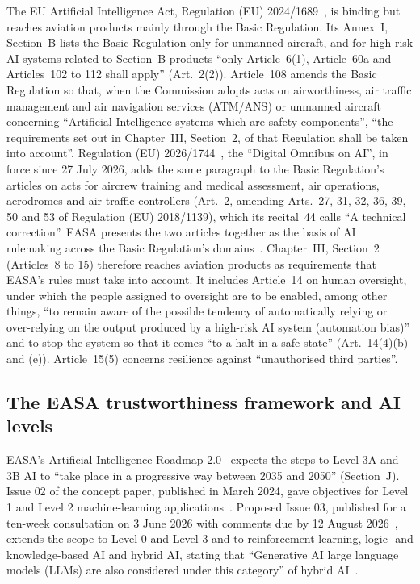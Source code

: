 \documentclass[11pt]{article}
\begin{document}
The EU Artificial Intelligence Act, Regulation (EU) 2024/1689~\cite{euaiact2024}, is binding but reaches aviation products mainly through the Basic Regulation. Its Annex~I, Section~B lists the Basic Regulation only for unmanned aircraft, and for high-risk AI systems related to Section~B products ``only Article~6(1), Article~60a and Articles~102 to 112 shall apply'' (Art.~2(2)). Article~108 amends the Basic Regulation so that, when the Commission adopts acts on airworthiness, air traffic management and air navigation services (ATM/ANS) or unmanned aircraft concerning ``Artificial Intelligence systems which are safety components'', ``the requirements set out in Chapter~III, Section~2, of that Regulation shall be taken into account''. Regulation (EU) 2026/1744~\cite{eu2026omnibus}, the ``Digital Omnibus on AI'', in force since 27 July 2026, adds the same paragraph to the Basic Regulation's articles on acts for aircrew training and medical assessment, air operations, aerodromes and air traffic controllers (Art.~2, amending Arts.~27, 31, 32, 36, 39, 50 and 53 of Regulation (EU) 2018/1139), which its recital~44 calls ``A technical correction''. EASA presents the two articles together as the basis of AI rulemaking across the Basic Regulation's domains~\cite[slide~21]{easa2026aidays}. Chapter~III, Section~2 (Articles~8 to 15) therefore reaches aviation products as requirements that EASA's rules must take into account. It includes Article~14 on human oversight, under which the people assigned to oversight are to be enabled, among other things, ``to remain aware of the possible tendency of automatically relying or over-relying on the output produced by a high-risk AI system (automation bias)'' and to stop the system so that it comes ``to a halt in a safe state'' (Art.~14(4)(b) and (e)). Article~15(5) concerns resilience against ``unauthorised third parties''.

\subsection{The EASA trustworthiness framework and AI levels}\label{sec:levels}

EASA's Artificial Intelligence Roadmap 2.0~\cite{easa2023roadmap} expects the steps to Level 3A and 3B AI to ``take place in a progressive way between 2035 and 2050'' (Section~J). Issue 02 of the concept paper, published in March 2024, gave objectives for Level 1 and Level 2 machine-learning applications~\cite{easa2024concept}. Proposed Issue 03, published for a ten-week consultation on 3 June 2026 with comments due by 12 August 2026~\cite{easa2026news}, extends the scope to Level 0 and Level 3 and to reinforcement learning, logic- and knowledge-based AI and hybrid AI, stating that ``Generative AI large language models (LLMs) are also considered under this category'' of hybrid AI~\cite[Section~B.1]{easa2026concept}.
\end{document}
